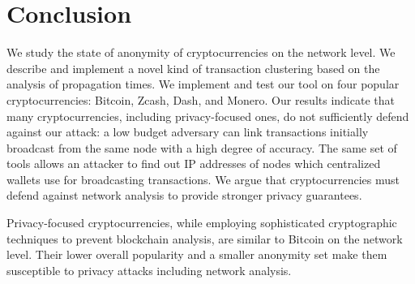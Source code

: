 \section{Conclusion} \label{sec:Ch03Conclusion}

We study the state of anonymity of cryptocurrencies on the network level.
We describe and implement a novel kind of transaction clustering based on the analysis of propagation times.
We implement and test our tool on four popular cryptocurrencies: Bitcoin, Zcash, Dash, and Monero.
Our results indicate that many cryptocurrencies, including privacy-focused ones, do not sufficiently defend against our attack: a low budget adversary can link transactions initially broadcast from the same node with a high degree of accuracy.
The same set of tools allows an attacker to find out IP addresses of nodes which centralized wallets use for broadcasting transactions.
We argue that cryptocurrencies must defend against network analysis to provide stronger privacy guarantees.

Privacy-focused cryptocurrencies, while employing sophisticated cryptographic techniques to prevent blockchain analysis, are similar to Bitcoin on the network level.
Their lower overall popularity and a smaller anonymity set make them susceptible to privacy attacks including network analysis.
